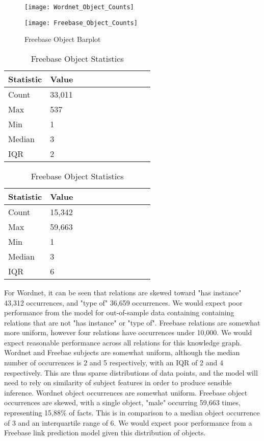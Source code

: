 
\begin{figure}[H]
	\parbox{.5\linewidth}{
   		\caption{Wordnet Object Barplot}
   		\centering
    		\texttt{[image: Wordnet\_Object\_Counts]}
		}
	\hfill
	\parbox{.5\linewidth}{
		\caption{Freebase Object Barplot}
   		\centering
		\texttt{[image: Freebase\_Object\_Counts]}
		}
\end{figure}


\begin{table}[H]
	\parbox{.5\linewidth}{
		\caption{Wordnet Object Statistics}
		\centering
		\begin{tabular}{lllllllllll}
  			\textbf{Statistic} & \textbf{Value}  \\
  			\hline
			Count & 33,011 \\
			Max & 537 \\
			Min & 1 \\
  			Median & 3 \\
  			IQR & 2 \\
		\end{tabular}
		}
	\hfill
	\parbox{.5\linewidth}{
		\caption{Freebase Object Statistics}
		\centering
		\begin{tabular}{lllllllllll}
  			\textbf{Statistic} & \textbf{Value}  \\
  			\hline
			Count & 15,342 \\
			Max & 59,663 \\
			Min & 1 \\
  			Median & 3 \\
  			IQR & 6 \\
		\end{tabular}
		}
\end{table}

For Wordnet, it can be seen that relations are skewed toward "has instance" 43,312 occurrences, and "type of" 36,659 occurrences. We would expect poor performance from the model for out-of-sample data containing
containing relations that are not "has instance" or "type of". Freebase relations are somewhat more uniform, however four relations have occurrences under 10,000. We would expect reasonable performance across all relations for this knowledge graph. \newline
Wordnet and Freebae subjects are somewhat uniform, although the median number of occurrences is 2 and 5 respectively, with an IQR of 2 and 4 respectively. This are thus sparse distributions of data points, and the model will need to rely on 
similarity of subject features in order to produce sensible inference. \newline
Wordnet object occurrences are somewhat uniform. Freebase object occurrences are skewed, with a single object, "male" occurring 59,663 times, representing 15,88\% of facts. This is in comparison to a median object occurrence of 3 and an interquartile range of 6.
We would expect poor performance from a Freebase link prediction model given this distribution of objects. \newline

